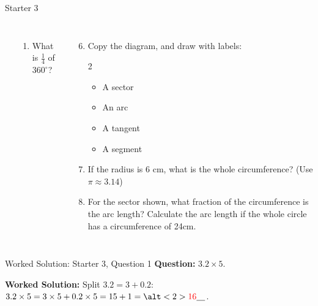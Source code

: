 \documentclass{beamer}
\newcommand{\ablank}[1]{%
  \alt<2>{\textcolor{red}{#1}}{\underline{\phantom{#1}}}%
}
\newcommand{\ashow}[1]{\uncover<2->{\textcolor{red}{\small #1}}}
\begin{document}
\begin{frame}{Starter 3}
\begin{columns}
\begin{center}
\begin{tikzpicture}[scale=1]
\end{tikzpicture}

\end{center}

\small
\begin{enumerate}
  \item What is $\frac{1}{4}$ of $360^\circ$? \ashow{$90^\circ$}
\end{enumerate}

\begin{enumerate}
  \setcounter{enumi}{5}
  \item Copy the diagram, and draw with labels:
    \begin{multicols}{2}
    \begin{itemize}
      \item A sector
      \item An arc
      \item A tangent
      \item A segment
    \end{itemize}
    \end{multicols}
  \item If the radius is $6$ cm, what is the whole circumference? (Use $\pi \approx 3.14$) \ashow{$37.68$ cm}
  \item For the sector shown, what fraction of the circumference is the arc length? Calculate the arc length if the whole circle has a circumference of 24cm. \ashow{$\frac{1}{6}$; $4$ cm}

\end{enumerate}

\end{columns}
\end{frame}

\begin{frame}{Worked Solution: Starter 3, Question 1}
\hypertarget{work-st3}{}
\small
\textbf{Question:} \(3.2\times5\).

\textbf{Worked Solution:} Split \(3.2=3+0.2\):
\(3.2\times5=3\times5+0.2\times5=15+1=\ablank{16}\).
\end{frame}
\end{document}
